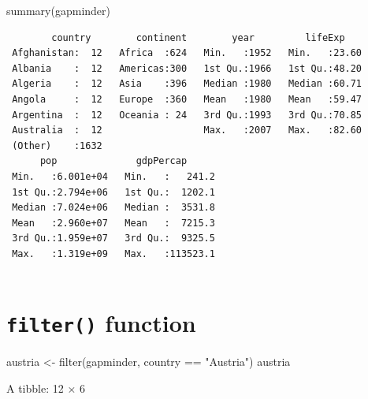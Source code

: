 \documentclass[
  letterpaper,
  DIV=11,
  numbers=noendperiod]{scrreprt}
\newenvironment{Shaded}{\begin{snugshade}}{\end{snugshade}}
\newcommand{\FunctionTok}[1]{\textcolor[rgb]{0.28,0.35,0.67}{#1}}
\newcommand{\NormalTok}[1]{\textcolor[rgb]{0.00,0.23,0.31}{#1}}
\newcommand{\OtherTok}[1]{\textcolor[rgb]{0.00,0.23,0.31}{#1}}
\newcommand{\SpecialCharTok}[1]{\textcolor[rgb]{0.37,0.37,0.37}{#1}}
\newcommand{\StringTok}[1]{\textcolor[rgb]{0.13,0.47,0.30}{#1}}
\begin{document}
\begin{Shaded}
\begin{Highlighting}[]
\FunctionTok{summary}\NormalTok{(gapminder)}
\end{Highlighting}
\end{Shaded}

\begin{verbatim}
        country        continent        year         lifeExp     
 Afghanistan:  12   Africa  :624   Min.   :1952   Min.   :23.60  
 Albania    :  12   Americas:300   1st Qu.:1966   1st Qu.:48.20  
 Algeria    :  12   Asia    :396   Median :1980   Median :60.71  
 Angola     :  12   Europe  :360   Mean   :1980   Mean   :59.47  
 Argentina  :  12   Oceania : 24   3rd Qu.:1993   3rd Qu.:70.85  
 Australia  :  12                  Max.   :2007   Max.   :82.60  
 (Other)    :1632                                                
      pop              gdpPercap       
 Min.   :6.001e+04   Min.   :   241.2  
 1st Qu.:2.794e+06   1st Qu.:  1202.1  
 Median :7.024e+06   Median :  3531.8  
 Mean   :2.960e+07   Mean   :  7215.3  
 3rd Qu.:1.959e+07   3rd Qu.:  9325.5  
 Max.   :1.319e+09   Max.   :113523.1  
                                       
\end{verbatim}

\section{\texorpdfstring{\texttt{filter()}
function}{filter() function}}\label{filter-function}

\begin{Shaded}
\begin{Highlighting}[]
\NormalTok{austria }\OtherTok{\textless{}{-}} \FunctionTok{filter}\NormalTok{(gapminder, country }\SpecialCharTok{==} \StringTok{"Austria"}\NormalTok{)}
\NormalTok{austria}
\end{Highlighting}
\end{Shaded}

A tibble: 12 × 6
\end{document}
